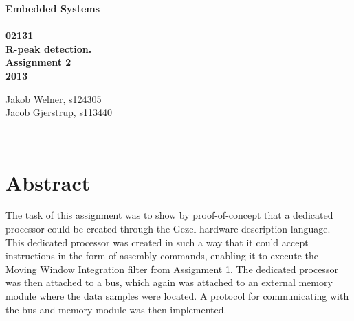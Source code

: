 \documentclass[12pt,a4paper]{article}
\begin{document}
\begin{titlepage}
	\begin{center}
		\vspace*{13\baselineskip}
		\huge
		\bfseries
		Embedded Systems\\ 
		\ \\
		02131 \\[5\baselineskip]

		\normalfont
		\Large
		R-peak detection. \\
		Assignment 2\\	
		2013

		\small
		\vfill
	\end{center}	
	\begin{flushleft}
		Jakob Welner, s124305\\
	 	Jacob Gjerstrup, s113440\\
	\end{flushleft}
\end{titlepage}

\ \\
\section*{Abstract}
The task of this assignment was to show by proof-of-concept that a dedicated processor could be created through the Gezel hardware description language. This dedicated processor was created in such a way that it could accept instructions in the form of assembly commands, enabling it to execute the Moving Window Integration filter from Assignment 1. The dedicated processor was then attached to a bus, which again was attached to an external memory module where the data samples were located. A protocol for communicating with the bus and memory module was then implemented.

\thispagestyle{empty} 
\newpage

\tableofcontents
\thispagestyle{empty} 
\newpage

\setcounter{page}{1}

\ \\
\end{document}
